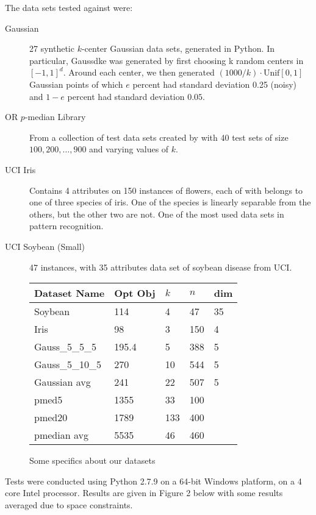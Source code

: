 \documentclass{article}
\begin{document}
The data sets tested against were:
\begin{description}
\item[Gaussian] 27 synthetic $k$-center Gaussian data sets, generated in Python. In particular, Gauss\textunderscore d\textunderscore k\textunderscore e was generated by first choosing k random centers in $[-1,1]^d$. Around each center, we then generated $(1000/k) \cdot \mathrm{Unif}[0,1]$ Gaussian points of which $e$ percent had standard deviation 0.25 (noisy) and $1-e$ percent had standard deviation $0.05$. 
\item[OR $p$-median Library] From a collection of test data sets created by \cite{Beasley} with 40 test sets of size $100, 200, \ldots, 900$ and varying values of $k$. 
\item[UCI Iris] \cite{Iris} Contains 4 attributes on 150 instances of flowers, each of with belongs to one of three species of iris.  One of the species is linearly separable from the others, but the other two are not.  One of the most used data sets in pattern recognition.
\item[UCI Soybean (Small)] \cite{Soybean} 47 instances, with 35 attributes data set of soybean disease from UCI.
\end{description} 

\begin{figure}[h]
\begin{tabular}{ | l | l | l | l | l | }
\hline
 Dataset Name & Opt Obj & $k$ & $n$ & dim \\ \hline
Soybean & 114 & 4 & 47 & 35 \\ 
Iris & 98 & 3 & 150 & 4 \\ 
Gauss\_5\_5\_5 & 195.4 & 5 & 388 & 5 \\ 
Gauss\_5\_10\_5 & 270 & 10 & 544 & 5 \\ 
Gaussian avg & 241 & 22 & 507 & 5 \\ 
pmed5 & 1355 & 33 & 100 & \  \\ 
pmed20 & 1789 & 133 & 400 & \  \\ 
pmedian avg & 5535 & 46 & 460 & \  \\ \hline
 \end{tabular}
\caption{Some specifics about our datasets}
\end{figure}

Tests were conducted using Python 2.7.9 on a 64-bit Windows platform, on a 4 core Intel processor. Results are given in Figure 2  below with some results averaged due to space constraints. 
\end{document}
